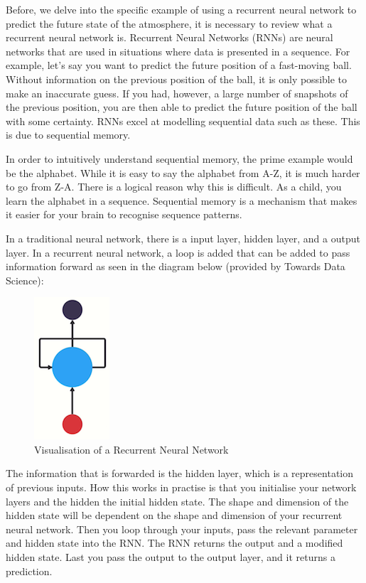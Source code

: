 Before, we delve into the specific example of using a recurrent neural network to predict the future state of the atmosphere, it is necessary to review what a recurrent neural network is. Recurrent Neural Networks (RNNs) are neural networks that are used in situations where data is presented in a sequence. For example, let's say you want to predict the future position of a fast-moving ball. Without information on the previous position of the ball, it is only possible to make an inaccurate guess. If you had, however, a large number of snapshots of the previous position, you are then able to predict the future position of the ball with some certainty. RNNs excel at modelling sequential data such as these. This is due to sequential memory.

In order to intuitively understand sequential memory, the prime example would be the alphabet. While it is easy to say the alphabet from A-Z, it is much harder to go from Z-A. There is a logical reason why this is difficult. As a child, you learn the alphabet in a sequence. Sequential memory is a mechanism that makes it easier for your brain to recognise sequence patterns.

In a traditional neural network, there is a input layer, hidden layer, and a output layer. In a recurrent neural network, a loop is added that can be added to pass information forward as seen in the diagram below (provided by Towards Data Science)\cite{intro_rnn}:

\begin{figure}[H]
    \centering
    \includegraphics[width=.2\linewidth]{Images/rnn.png}
    \caption{Visualisation of a Recurrent Neural Network}
\end{figure}

The information that is forwarded is the hidden layer, which is a representation of previous inputs. How this works in practise is that you initialise your network layers and the hidden the initial hidden state. The shape and dimension of the hidden state will be dependent on the shape and dimension of your recurrent neural network. Then you loop through your inputs, pass the relevant parameter and hidden state into the RNN. The RNN returns the output and a modified hidden state. Last you pass the output to the output layer, and it returns a prediction. 

